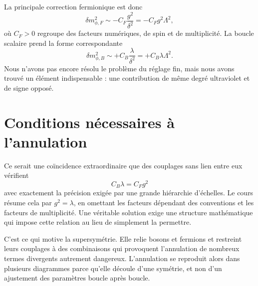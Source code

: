 \begin{classroomqa}
\end{classroomqa}

La principale correction fermionique est donc
\begin{equation}
\delta m_{\phi,F}^2
\sim -C_F\frac{g^2}{\delta^2}
=-C_Fg^2\Lambda^2,
\end{equation}
où \(C_F>0\) regroupe des facteurs numériques, de spin et de multiplicité. La boucle scalaire prend la forme correspondante
\begin{equation}
\delta m_{\phi,B}^2
\sim+C_B\frac{\lambda}{\delta^2}
=+C_B\lambda\Lambda^2.
\end{equation}
Nous n’avons pas encore résolu le problème du réglage fin, mais nous avons trouvé un élément indispensable : une contribution de même degré ultraviolet et de signe opposé.

\section{Conditions nécessaires à l’annulation}

Ce serait une coïncidence extraordinaire que des couplages sans lien entre eux vérifient
\begin{equation}
C_B\lambda=C_Fg^2
\end{equation}
avec exactement la précision exigée par une grande hiérarchie d’échelles. Le cours résume cela par \(g^2=\lambda\), en omettant les facteurs dépendant des conventions et les facteurs de multiplicité. Une véritable solution exige une structure mathématique qui impose cette relation au lieu de simplement la permettre.

C’est ce qui motive la supersymétrie. Elle relie bosons et fermions et restreint leurs couplages à des combinaisons qui provoquent l’annulation de nombreux termes divergents autrement dangereux. L’annulation se reproduit alors dans plusieurs diagrammes parce qu’elle découle d’une symétrie, et non d’un ajustement des paramètres boucle après boucle.

